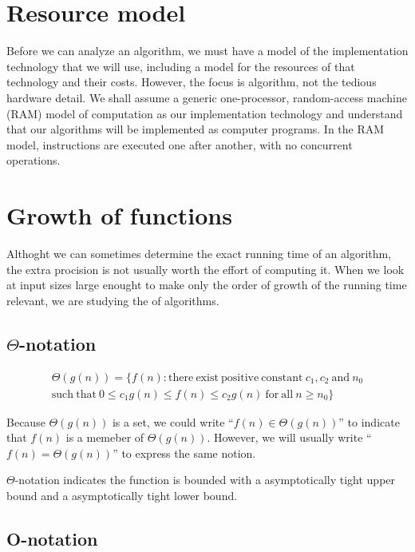 \section{Resource model}


Before we can analyze an algorithm, we must have a model of the implementation technology that we will use, including a model for the resources of that technology and their costs. 
However, the focus is algorithm, not the tedious hardware detail.
We shall assume a generic one-processor, random-access machine (RAM) model of computation as our implementation technology and understand
that our algorithms will be implemented as computer programs.
In the RAM model, instructions are executed one after another, with no concurrent operations.



\section{Growth of functions}

Althoght we can sometimes determine the exact running time of an algorithm, the extra procision is not usually worth the effort of computing it.
When we look at input sizes large enought to make only the order of growth of the running time relevant, we are studying the  of algorithms.


\subsection{$\Theta$-notation}

\begin{gather*}
  \Theta(g(n)) = \{ f(n): \mathrm{there\ exist\ positive\ constant\ } c_1, c_2\ \mathrm{and} \ n_0 \\
  \mathrm{such\ that\ } 0\le c_1 g(n) \le f(n) \le c_2 g(n) \mathrm{\ for\ all\ } n\ge n_0 \}
\end{gather*}

Because $\Theta(g(n))$ is a set, we could write ``$f(n) \in \Theta(g(n))$'' to indicate that $f(n)$ is a memeber of $\Theta(g(n))$.
However, we will usually write ``$f(n)=\Theta(g(n))$'' to express the same notion.

$\Theta$-notation indicates the function is bounded with a asymptotically tight upper bound and a asymptotically tight lower bound.

\subsection{O-notation}

